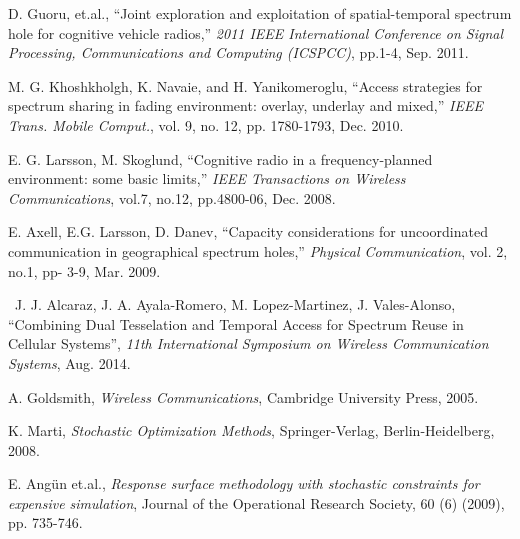 \begin{thebibliography}{}
 D. Guoru, et.al., ``Joint exploration and exploitation of spatial-temporal spectrum hole for cognitive vehicle radios,'' \emph{2011 IEEE International Conference on Signal Processing, Communications and Computing (ICSPCC)}, pp.1-4, Sep. 2011.

  M. G. Khoshkholgh, K. Navaie, and H. Yanikomeroglu, ``Access strategies for spectrum sharing in fading environment: overlay, underlay and mixed,'' \emph{IEEE Trans. Mobile Comput.}, vol. 9, no. 12, pp. 1780-1793, Dec. 2010.

 E. G. Larsson, M. Skoglund, ``Cognitive radio in a frequency-planned environment: some basic limits,'' \emph{IEEE Transactions on Wireless Communications}, vol.7, no.12, pp.4800-06, Dec. 2008.

 E. Axell, E.G. Larsson, D. Danev, ``Capacity considerations for uncoordinated communication in geographical spectrum holes,'' \emph{Physical Communication}, vol. 2, no.1, pp- 3-9, Mar. 2009.

 J. J. Alcaraz, J. A. Ayala-Romero, M. Lopez-Martinez, J. Vales-Alonso, ``Combining Dual Tesselation and Temporal Access for Spectrum Reuse in Cellular Systems'', \emph{11th International Symposium on Wireless Communication Systems}, Aug. 2014.

 A. Goldsmith, \emph{Wireless Communications}, Cambridge University Press, 2005.

 K. Marti, \emph{Stochastic Optimization Methods}, Springer-Verlag, Berlin-Heidelberg, 2008.

 E. Angün et.al., \emph{Response surface methodology with stochastic constraints for expensive simulation}, Journal of the Operational Research Society, 60 (6) (2009), pp. 735-746.

\end{thebibliography}

